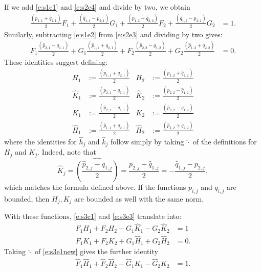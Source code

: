 \documentclass[11pt]{amsart}
\begin{document}
If we add \eqref{e:s1e1} and \eqref{e:s2e4} and divide by two, we obtain
\begin{align}
\label{e:s3e1} \frac{(p_{1,1}+\hat{q}_{2,1})}{2}F_1+\frac{(\hat q_{1,1} - p_{2,1})}{2}G_1+\frac{(p_{1,2}+\hat{q}_{2,2})}{2}F_2+\frac{(\hat q_{1,2}-p_{2,2})}{2}G_2 & = 1.
\end{align}
Similarly, subtracting \eqref{e:s1e2} from \eqref{e:s2e3} and dividing by two gives:
\begin{align}
\label{e:s3e3} F_1\frac{(\hat p_{2,1} - q_{1,1})}{2}+G_1\frac{(\hat p_{1,1}+q_{2,1})}{2}+F_2\frac{(\hat p_{2,2} - q_{1,2})}{2}+G_2\frac{(\hat p_{1,2}+q_{2,2})}{2} & = 0.
\end{align}
These identities suggest defining:
\begin{align*}
H_1 & := \frac{(p_{1,1}+\hat{q}_{2,1})}{2} & H_2  & :=\frac{(p_{1,2}+\hat{q}_{2,2})}{2}\\
\hat{K}_1 & := \frac{(p_{2,1}-\hat q_{1,1})}{2} & \hat{K}_2 & := \frac{(p_{2,2}-\hat q_{1,2})}{2}\\
K_1 & := \frac{(\hat p_{2,1} - q_{1,1})}{2} & K_2 & :=  \frac{(\hat p_{2,2} - q_{1,2})}{2}\\
\hat{H}_1 & := \frac{(\hat{p}_{1,1}+q_{2,1})}{2} & \hat{H}_2  & :=\frac{(\hat{p}_{1,2}+q_{2,2})}{2}
\end{align*}
where the identities for $\hat{h}_j$ and $\hat{k}_j$ follow simply by taking $\hat{\cdot}$ of the definitions for $H_j$ and $K_j$.  Indeed, note that
$$
\hat K_j = \widehat{\left(\frac{\hat p_{2,j} - q_{1,j}}{2}\right)} = \frac{p_{2,j} - \hat q_{1,j}}{2} = -\frac{\hat q_{1,j} - p_{2,j}}{2},
$$
which matches the formula defined above.  If the functions $p_{i,j}$ and $q_{i,j}$ are bounded, then $H_j, K_j$ are bounded as well with the same norm.

With these functions, \eqref{e:s3e1} and \eqref{e:s3e3} translate into:
\begin{align}
\label{e:s3e1new} F_1H_1+F_2H_2-G_1\hat{K}_1-G_2\hat{K}_2  &= 1\\
\label{e:s3e3new} F_1K_1+F_2K_2+G_1\hat{H}_1+G_2\hat{H}_2 & =0.
\end{align}
Taking $\hat{\cdot}$ of \eqref{e:s3e1new} gives the further identity
\begin{align}
\label{e:s3e2new}  \hat{F}_1\hat{H}_1+\hat{F}_2\hat{H}_2-\hat{G}_1K_1-\hat{G}_2 K_2 &  = 1.
\end{align}
\end{document}
